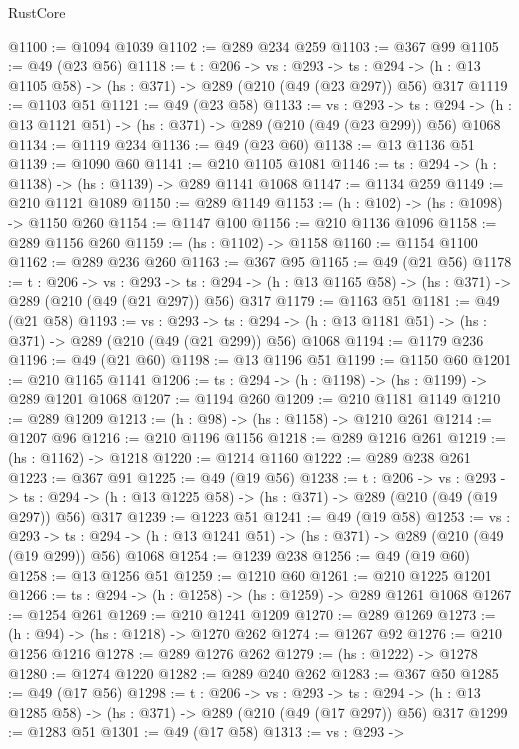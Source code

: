 \begin{lexlean}{RustCore}
\begin{coremodule}
@1100 := @1094 @1039
@1102 := @289 @234 @259
@1103 := @367 @99
@1105 := @49 (@23 @56)
@1118 := {t : @206} ->
  {vs : @293} ->
  {ts : @294} -> (h : @13 @1105 @58) -> (hs : @371) -> @289 (@210 (@49 (@23 @297)) @56) @317
@1119 := @1103 @51
@1121 := @49 (@23 @58)
@1133 := {vs : @293} ->
  {ts : @294} -> (h : @13 @1121 @51) -> (hs : @371) -> @289 (@210 (@49 (@23 @299)) @56) @1068
@1134 := @1119 @234
@1136 := @49 (@23 @60)
@1138 := @13 @1136 @51
@1139 := @1090 @60
@1141 := @210 @1105 @1081
@1146 := {ts : @294} -> (h : @1138) -> (hs : @1139) -> @289 @1141 @1068
@1147 := @1134 @259
@1149 := @210 @1121 @1089
@1150 := @289 @1149
@1153 := (h : @102) -> (hs : @1098) -> @1150 @260
@1154 := @1147 @100
@1156 := @210 @1136 @1096
@1158 := @289 @1156 @260
@1159 := (hs : @1102) -> @1158
@1160 := @1154 @1100
@1162 := @289 @236 @260
@1163 := @367 @95
@1165 := @49 (@21 @56)
@1178 := {t : @206} ->
  {vs : @293} ->
  {ts : @294} -> (h : @13 @1165 @58) -> (hs : @371) -> @289 (@210 (@49 (@21 @297)) @56) @317
@1179 := @1163 @51
@1181 := @49 (@21 @58)
@1193 := {vs : @293} ->
  {ts : @294} -> (h : @13 @1181 @51) -> (hs : @371) -> @289 (@210 (@49 (@21 @299)) @56) @1068
@1194 := @1179 @236
@1196 := @49 (@21 @60)
@1198 := @13 @1196 @51
@1199 := @1150 @60
@1201 := @210 @1165 @1141
@1206 := {ts : @294} -> (h : @1198) -> (hs : @1199) -> @289 @1201 @1068
@1207 := @1194 @260
@1209 := @210 @1181 @1149
@1210 := @289 @1209
@1213 := (h : @98) -> (hs : @1158) -> @1210 @261
@1214 := @1207 @96
@1216 := @210 @1196 @1156
@1218 := @289 @1216 @261
@1219 := (hs : @1162) -> @1218
@1220 := @1214 @1160
@1222 := @289 @238 @261
@1223 := @367 @91
@1225 := @49 (@19 @56)
@1238 := {t : @206} ->
  {vs : @293} ->
  {ts : @294} -> (h : @13 @1225 @58) -> (hs : @371) -> @289 (@210 (@49 (@19 @297)) @56) @317
@1239 := @1223 @51
@1241 := @49 (@19 @58)
@1253 := {vs : @293} ->
  {ts : @294} -> (h : @13 @1241 @51) -> (hs : @371) -> @289 (@210 (@49 (@19 @299)) @56) @1068
@1254 := @1239 @238
@1256 := @49 (@19 @60)
@1258 := @13 @1256 @51
@1259 := @1210 @60
@1261 := @210 @1225 @1201
@1266 := {ts : @294} -> (h : @1258) -> (hs : @1259) -> @289 @1261 @1068
@1267 := @1254 @261
@1269 := @210 @1241 @1209
@1270 := @289 @1269
@1273 := (h : @94) -> (hs : @1218) -> @1270 @262
@1274 := @1267 @92
@1276 := @210 @1256 @1216
@1278 := @289 @1276 @262
@1279 := (hs : @1222) -> @1278
@1280 := @1274 @1220
@1282 := @289 @240 @262
@1283 := @367 @50
@1285 := @49 (@17 @56)
@1298 := {t : @206} ->
  {vs : @293} ->
  {ts : @294} -> (h : @13 @1285 @58) -> (hs : @371) -> @289 (@210 (@49 (@17 @297)) @56) @317
@1299 := @1283 @51
@1301 := @49 (@17 @58)
@1313 := {vs : @293} ->

\end{coremodule}
\end{lexlean}
